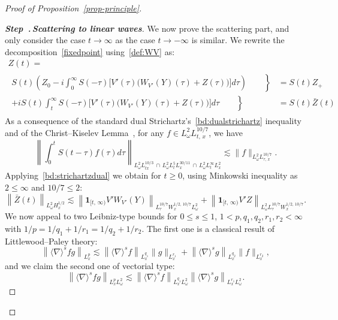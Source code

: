 \documentclass[AHL, Unicode, longabstracts,published]{cedram}
\newcommand{\bfun}{\mathbf{1}}
\newcounter{stepcount}
\newenvironment{step}[1]{\refstepcounter{stepcount}\begin{proof}[{\bf{Step~\thestepcount}{.\,\emph{#1}}}]}{\let\qed\relax\end{proof}}
\begin{document}
\begin{proof}[Proof of Proposition~\ref{prop-principle}]
\begin{step}{{Scattering to linear waves}}\label{proofpro3.1step2}
We now prove the scattering part, and only consider the case $t\rightarrow \infty$ as the case $t\rightarrow -\infty$ is similar. We rewrite the decomposition~\eqref{fixedpoint} using~\eqref{def:WV} as:
\begin{multline} \label{def:Z+}
Z(t)=\\
\begin{aligned}
\left. S(t)\left(Z_0 -i \int_{0}^\infty S(-\tau) \Big[V'(\tau) \big(W_{V'}(Y)(\tau) +Z(\tau)\big) \Big] d\tau \right)\qquad \right\}&=S(t)Z_+\\
\left. +iS(t) \int_{t}^\infty S(- \tau) \Big[V'(\tau) \big(W_{V'}(Y)(\tau) +Z(\tau)\big) \Big] d\tau \qquad \right\}&=S(t)\bar Z(t)
\end{aligned}
\end{multline}
As a consequence of the standard dual Strichartz's~\eqref{bd:dualstrichartz} inequality and of the Christ--Kiselev Lemma~\cite{ChKi}, for any $f\in L^2_\omega L^{10/7}_{t,\,x}$, we have
\begin{equation} \label{bd:strichartzdual}
\left\| \int_0^t S(t-\tau)f(\tau)d\tau \right\|_{L^2_\omega L^{10/3}_{tx}\,\cap\,L^2_\omega L^{5}_tL^{30/11}_x\,\cap\,L^2_\omega L^{\infty}_t L^2_x }\lesssim \| f \|_{ L^2_\omega L^{10/7}_{\tau,\,x}}.
\end{equation}
Applying~\eqref{bd:strichartzdual} we obtain for $t\geq 0$, using Minkowski inequality as $2\leq \infty$ and $10/7\leq 2$:
\[
\left\| \bar Z(t)\right\|_{L^2_\omega H^{1/2}_x} \lesssim \left\|\bfun_{[t,\,\infty)}V' W_{V'}(Y)\right\|_{L^{10/7}_\tau W^{1/2,\,10/7}_x L^2_\omega}+\left\| \bfun_{[t,\,\infty)}V' Z\right\|_{L^2_\omega L^{10/7}_\tau W^{1/2,\,10/7}_x}.
\]
We now appeal to two Leibniz-type bounds for $0\leq s \leq 1$, $1<p,q_1,q_2,r_1,r_2<\infty$ with $1/p=1/q_1+1/r_1=1/q_2+1/r_2$. The first one is a classical result of Littlewood--Paley theory:
\begin{equation} \label{bd:fractionalleibniz1}
\left\| \langle \nabla \rangle^{s}fg \right\|_{L^p_x}\lesssim \left\| \langle \nabla \rangle^{s} f\right\|_{L^{q_1}_x}\| g\|_{L^{r_1}_x}+\left\| \langle \nabla \rangle^{s} g\right\|_{L^{q_2}_x}\| f\|_{L^{r_2}_x},
\end{equation}
and we claim the second one of vectorial type:
\begin{equation} \label{bd:fractionalleibniz2}
\left\| \langle \nabla \rangle^{s}fg \right\|_{L^p_x L^2_\omega}\lesssim \left\| \langle \nabla \rangle^{s} f\right\|_{L^{q_1}_xL^2_\omega}\left\| \langle \nabla \rangle^{s} g\right\|_{L^{r_1}_x L^2_\omega}.

\end{equation}
\end{step}
\end{proof}
\end{document}
